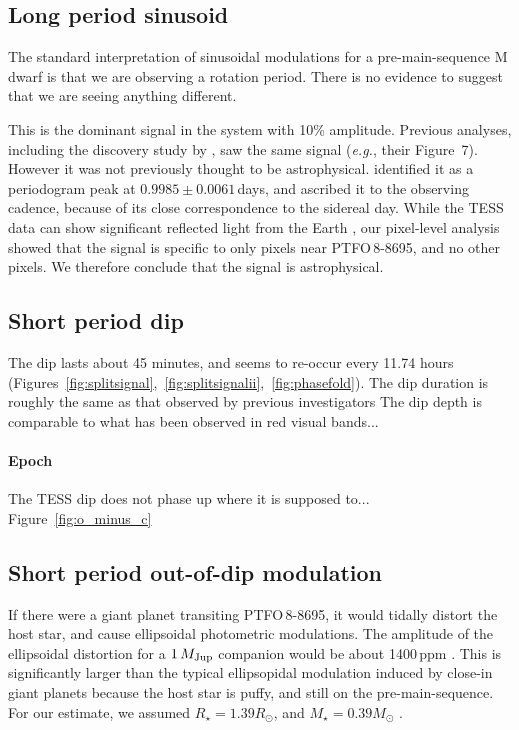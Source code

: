 \documentclass[12pt,twocolumn,tighten]{aastex62}
\newcommand{\ptfo}{PTFO$\,$8-8695}
\begin{document}
\subsection{Long period sinusoid}

The standard interpretation of sinusoidal modulations for a
pre-main-sequence M dwarf is that we are observing a rotation period.
There is no evidence to suggest that we are seeing anything different.

This is the dominant signal in the system with 10\% amplitude.
Previous analyses, including the discovery study by
\citet{van_eyken_ptf_2012}, saw the same signal ({\it e.g.}, their
Figure~7).  However it was not previously thought to be astrophysical.
\citet{van_eyken_ptf_2012} identified it as a periodogram peak at
$0.9985 \pm 0.0061\,$days, and ascribed it to the observing cadence,
because of its close correspondence to the sidereal day.  While the
TESS data can show significant reflected light from the Earth
\citep[{\it e.g.},][]{luger_tess_2019}, our pixel-level analysis
showed that the signal is specific to only pixels near \ptfo, and no
other pixels.  We therefore conclude that the signal is astrophysical.


\subsection{Short period dip}
The dip lasts about 45 minutes, and seems to re-occur every 11.74
hours
(Figures~\ref{fig:splitsignal},~\ref{fig:splitsignalii},~\ref{fig:phasefold}).
The dip duration is roughly the same as that observed by previous
investigators \citep{van_eyken_ptf_2012,yu_tests_2015}
The dip depth is comparable to what has been observed in red visual
bands...

\paragraph{Epoch}
The TESS dip does not phase up where it is supposed to...
Figure~\ref{fig:o_minus_c}

\subsection{Short period out-of-dip modulation}
If there were a giant planet transiting \ptfo, it would tidally
distort the host star, and cause ellipsoidal photometric modulations.
The amplitude of the ellipsoidal distortion for a $1\,M_{\rm Jup}$
companion would be about 1400$\,$ppm
\citep{shporer_astrophysics_2017}.  This is significantly larger than
the typical ellipsopidal modulation induced by close-in giant planets
because the host star is puffy, and still on the pre-main-sequence.
For our estimate, we assumed $R_\star = 1.39 R_\odot$, and $M_\star =
0.39 M_\odot$ \citep{van_eyken_ptf_2012}. 
\end{document}
